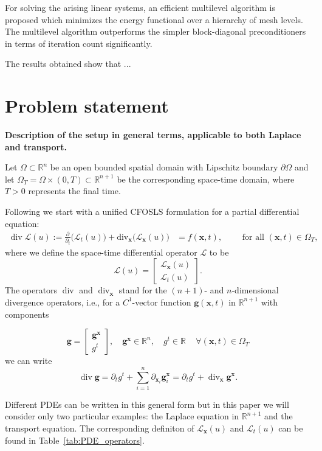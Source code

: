 \documentclass[a4paper,12pt]{amsart}
\numberwithin{equation}{section}
\renewcommand{\div}{\operatorname{div}}
\renewcommand{\L}{{\mathcal L}}
\def\XVec#1{{\mathbf #1}}
\def\Xx{\XVec{x}}
\begin{document}
For solving the arising linear systems, an efficient multilevel algorithm is proposed which minimizes the energy functional over a hierarchy of mesh levels. The multilevel algorithm outperforms the simpler block-diagonal preconditioners in terms of iteration count significantly.

The results obtained show that ...

\section{Problem statement}

\textbf{Description of the setup in general terms, applicable to both Laplace and transport.}

\bigskip

Let $\Omega\subset \mathbb{R}^n$ be an open bounded spatial domain with Lipschitz boundary $\partial \Omega$ and let 
$\Omega_{T} = \Omega\times (0,T)\subset \mathbb{R}^{n+1}$ be the corresponding space-time domain,  where $T>0$ represents the final time.  

Following \cite{our_paper_cfosls} we start with a unified CFOSLS formulation for a partial differential equation:
\begin{align} \label{Problem}
\div \L(u) := \frac{\partial}{\partial_t} \big(\L_t(u) \big)+ \mathrm{div}_\Xx \big( \L_\Xx (u)\big)& = f(\Xx, t), \qquad \text{ for all } (\Xx,t) \in \Omega_T,
\end{align}
where we define the space-time differential operator $\L$ to be
\[
\L(u) =  \begin{bmatrix} \L_\Xx(u) \\ \L_t(u) \end{bmatrix}.
\]
The operators $\div$ and $\div_\Xx$ stand for the $(n+1)$- and $n$-dimensional divergence operators, i.e., for a $C^1$-vector function $\mathbf{g}(\Xx,t)$ in $\mathbb{R}^{n+1}$ with components

$$
\mathbf{g} =  \begin{bmatrix} \mathbf{g}^\Xx 
\\ g^t \end{bmatrix}, \quad 
\mathbf{g}^\Xx \in \mathbb{R}^{n}, \quad g^t \in \mathbb{R} \quad \, \forall (\Xx,t) \in \Omega_T
$$
we can write
$$
\div \mathbf{g} = \partial_t g^t + \sum_{i = 1}^{n} \partial_{\Xx_i} \mathbf{g}^{\Xx}_i = \partial_t g^t + \div_\Xx \mathbf{g}^{\Xx}.
$$

Different PDEs can be written in this general form but in this paper we will consider only two particular examples: the Laplace equation in $\mathbb{R}^{n+1}$ and the transport equation. The corresponding definiton of $\L_\Xx(u)$ and $\L_t(u)$ can be found  in Table~\ref{tab:PDE_operators}.
\end{document}
